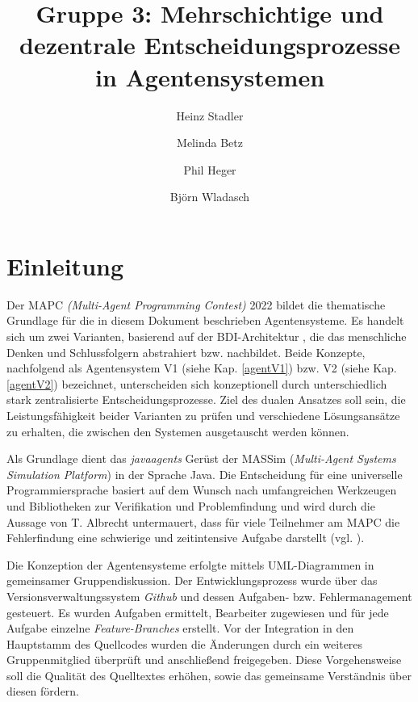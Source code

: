 \documentclass[runningheads]{llncs}
\begin{document}
	\title{Gruppe 3: Mehrschichtige und dezentrale Entscheidungsprozesse in Agentensystemen}
	\author{Heinz Stadler\and
		Melinda Betz\and
		Phil Heger\and
		Björn Wladasch}
	\maketitle              %
	\section{Einleitung}
	Der MAPC \textit{(Multi-Agent Programming Contest)} 2022 \cite{MAPC2021} bildet die thematische Grundlage für die in diesem Dokument beschrieben Agentensysteme. Es handelt sich um zwei Varianten, basierend auf der BDI-Architektur \cite{Bratman1987}, die das menschliche Denken und Schlussfolgern abstrahiert bzw. nachbildet. Beide Konzepte, nachfolgend als Agentensystem V1 (siehe Kap. \ref{agentV1}) bzw. V2 (siehe Kap. \ref{agentV2}) bezeichnet, unterscheiden sich konzeptionell durch unterschiedlich stark zentralisierte Entscheidungsprozesse.
	Ziel des dualen Ansatzes soll sein, die Leistungsfähigkeit beider Varianten zu prüfen und verschiedene Lösungsansätze zu erhalten, die zwischen den Systemen ausgetauscht werden können.

	
	Als Grundlage dient das \textit{javaagents} Gerüst der MASSim (\textit{Multi-Agent Systems Simulation Platform}) \cite{EISMASSim} in der Sprache Java. Die Entscheidung für eine universelle Programmiersprache basiert auf dem Wunsch nach umfangreichen Werkzeugen und Bibliotheken zur Verifikation und Problemfindung und wird durch die Aussage von T. Albrecht untermauert, dass für viele Teilnehmer am MAPC die Fehlerfindung eine schwierige und zeitintensive Aufgabe darstellt (vgl. \cite[S. 17]{Ahlbrecht2021}).
	
	Die Konzeption der Agentensysteme erfolgte mittels UML-Diagrammen in gemeinsamer Gruppendiskussion.
	Der Entwicklungsprozess wurde über das Versionsverwaltungssystem \textit{Github} und dessen Aufgaben- bzw. Fehlermanagement gesteuert. Es wurden Aufgaben ermittelt, Bearbeiter zugewiesen und für jede Aufgabe einzelne \textit{Feature-Branches} erstellt. Vor der Integration in den Hauptstamm des Quellcodes wurden die Änderungen durch ein weiteres Gruppenmitglied überprüft und anschließend freigegeben. Diese Vorgehensweise soll die Qualität des Quelltextes erhöhen, sowie das gemeinsame Verständnis über diesen fördern.
	
\end{document}
